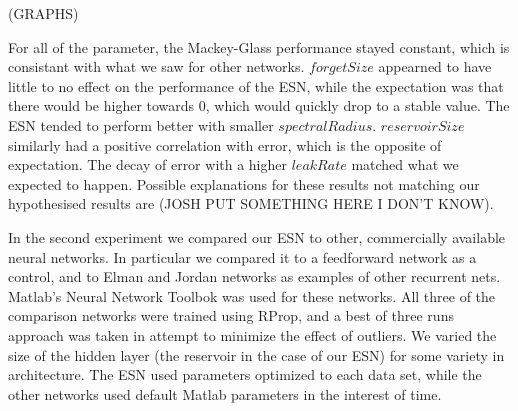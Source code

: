 \documentclass{acm_proc_article-sp}
\begin{document}
(GRAPHS)

For all of the parameter, the Mackey-Glass performance stayed constant, which is consistant with what we saw for other networks. $forgetSize$ appearned to have little to no effect on the performance of the ESN, while the expectation was that there would be higher towards 0, which would quickly drop to a stable value. The ESN tended to perform better with smaller $spectralRadius$.  $reservoirSize$ similarly had a positive correlation with error, which is the opposite of expectation.  The decay of error with a higher $leakRate$ matched what we expected to happen.  Possible explanations for these results not matching our hypothesised results are (JOSH PUT SOMETHING HERE I DON'T KNOW).

In the second experiment we compared our ESN to other, commercially available neural networks. In particular we compared it to a feedforward network as a control, and to Elman and Jordan networks as examples of other recurrent nets. Matlab's Neural Network Toolbok was used for these networks. All three of the comparison networks were trained using RProp, and a best of three runs approach was taken in attempt to minimize the effect of outliers. We varied the size of the hidden layer (the reservoir in the case of our ESN) for some variety in architecture. The ESN used parameters optimized to each data set, while the other networks used default Matlab parameters in the interest of time.
\end{document}
